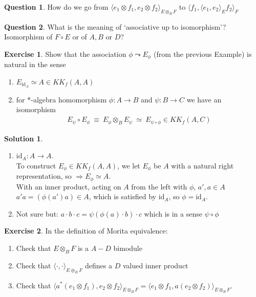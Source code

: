 \documentclass[a4paper]{article}
\theoremstyle{definition}
\theoremstyle{definition}
\newtheorem{question}{Question}
\theoremstyle{definition}
\theoremstyle{theorem}
\theoremstyle{theorem}
\newtheorem{exercise}{Exercise}
\theoremstyle{theorem}
\theoremstyle{definition}
\newtheorem{solution}{Solution}
\begin{document}
\begin{question}
 How do we go from $\langle e_1 \otimes f_1, e_2 \otimes f_2\rangle _{E\otimes _B F}$ to $
    \langle f_1,\langle e_1, e_2\rangle _E f_2\rangle _F$ \label{q: tensorproduct}
\end{question}

\begin{question}
What is the meaning of `associative up to isomorphism'? Isomorphism of $F \circ E$ or of $A, B$ or $D$?
\end{question}

\begin{exercise}
    Show that the association $\phi \leadsto E_\phi$ (from the previous Example) is natural
    in the sense
    \begin{enumerate}
        \item $E_{\text{id}_A} \simeq A \in KK_f(A,A)$
        \item for $*$-algebra homomorphism $\phi: A \rightarrow B$ and $\psi: B \rightarrow C$ we have
            an isomorphism
            \begin{align*}
                E_{\psi} \circ E_{\phi}\ \equiv\ E_{\phi} \otimes _B E_{\psi}\ \simeq\
                E_{\psi \circ \phi} \in KK_f(A,C)
            \end{align*}
    \end{enumerate}
\end{exercise}

\begin{solution}
    \begin{enumerate}
        \
        \item $\text{id}_A: A \rightarrow A$.\\
            To construct $E_{\phi}\in KK_f(A,A)$, we let $E_{\phi}$ be $A$ with a natural right
            representation, so $\Rightarrow E_{\phi}\simeq A$.\\
            With an inner product, acting on $A$ from the left with $\phi$, $a', a\in A$\\
            $a'a = (\phi(a') a) \in A $, which is satisfied by $\text{id}_A$, so $\phi = \text{id}_A$.
        \item Not sure but: $a \cdot b \cdot c = \psi(\phi(a) \cdot b) \cdot c$ which is in a sense
            $\psi \circ \phi$
    \end{enumerate}
\end{solution}

\begin{exercise}
    In the definition of Morita equivalence:
    \begin{enumerate}
        \item Check that $E \otimes _B F$ is a $A-D$ bimodule
        \item Check that $\langle \cdot,\cdot\rangle _{E\oplus _B F}$ defines a $D$ valued inner product
        \item Check that $\langle a^*(e_1 \otimes f_1), e_2 \otimes f_2\rangle _{E \otimes _B F} = \langle e_1 \otimes f_1, a(e_2 \otimes f_2)\rangle _{E \otimes _B F}$.
    \end{enumerate}
\end{exercise}
\end{document}
